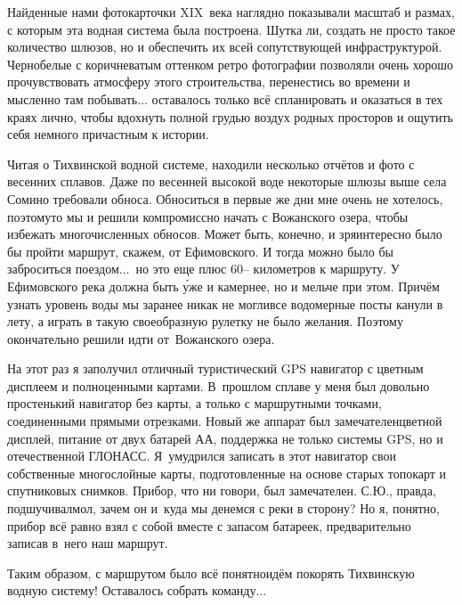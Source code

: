 Найденные нами фотокарточки XIX~века наглядно показывали масштаб и размах, с которым эта водная система была построена. Шутка ли, создать не просто такое количество шлюзов, но и обеспечить их всей сопутствующей инфраструктурой. Черно\sdash белые с коричневатым оттенком ретро фотографии позволяли очень хорошо прочувствовать атмосферу этого строительства, перенестись во времени и мысленно там побывать$\ldots$ оставалось только всё спланировать и оказаться в тех краях лично, чтобы вдохнуть полной грудью воздух родных просторов и ощутить себя немного причастным к истории.

Читая о Тихвинской водной системе, находили несколько отчётов и фото с весенних сплавов. Даже по весенней высокой воде некоторые шлюзы выше села Сомино требовали обноса. Обноситься в первые же дни мне очень не хотелось, поэтому\sdash то мы и решили компромиссно начать с Вожанского озера, чтобы избежать многочисленных обносов. Может быть, конечно, и зря\mdash интересно было бы пройти маршрут, скажем, от Ефимовского. И тогда можно было бы заброситься поездом$\ldots$~но это еще плюс 60\thinspace\nobreakdash-- километров к маршруту. У Ефимовского река должна быть \'{у}же и камернее, но и мельче при этом. Причём узнать уровень воды мы заранее никак не могли\mdash все водомерные посты канули в лету, а играть в такую своеобразную рулетку не было желания. Поэтому окончательно решили идти от~Вожанского озера. 

На этот раз я заполучил отличный туристический GPS навигатор с цветным дисплеем и полноценными картами. В~прошлом сплаве у меня был довольно простенький навигатор без карты, а только с маршрутными точками, соединенными прямыми отрезками. Новый же аппарат был замечателен\mdash цветной дисплей, питание от двух батарей АА, поддержка не только системы GPS, но и отечественной ГЛОНАСС. Я~умудрился записать в этот навигатор свои собственные многослойные карты, подготовленные на основе старых топокарт и спутниковых снимков. Прибор, что ни говори, был замечателен. С.Ю., правда, подшучивал\mdash мол, зачем он и~куда мы денемся с реки в сторону? Но я, понятно, прибор всё равно взял с собой вместе с запасом батареек, предварительно записав в~него наш маршрут.

Таким образом, с маршрутом было всё понятно\mdash идём покорять Тихвинскую водную систему! Оставалось собрать команду$\ldots$

\begin{center}
\end{center}
